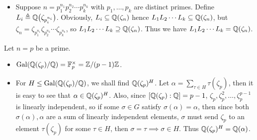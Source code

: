\begin{prop}
\begin{itemize}
      \begin{proof}
        Let $\sigma_k = (\zeta_n \mapsto \zeta_n^k) \in \Gal(\Qb(\zeta_n) / \Qb)$.
        The isomorphism is given by $\sigma_k \mapsto \bar{k}$.
        Clearly, it is a homomorphism since $\sigma_k \sigma_h = (\zeta_n \mapsto \zeta_n^{kh}) = \sigma_{kh}$.
        Also $\sigma_k = 1 \iff \bar{k} = 1$. Finally, $\abs{\Gal(\Qb(\zeta_n) / \Qb)} = \abs{\Fb_n^\times} = \varphi(n)$,
        so the map is onto.
      \end{proof}
    \item Suppose $n = p_1^{n_1} p_2^{n_2} \cdots p_k^{n_k}$ with $p_1, \dots, p_k$ are distinct primes.
      Define $L_i \triangleq \mathbb{Q}\big(\zeta_{p_i^{n_i}}\big)$. Obviously,
      $L_i \subseteq \mathbb{Q}(\zeta_n)$ hence $L_1 L_2 \dotsm L_k \subseteq \mathbb{Q}(\zeta_n)$,
      but $\zeta_n = \zeta_{p_1^{n_1}} \zeta_{p_2^{n_2}} \dotsm \zeta_{p_k^{n_k}}$,
      so $L_1 L_2 \dotsm L_k \supseteq \mathbb{Q}(\zeta_n)$. Thus we have
      $L_1 L_2 \dotsm L_k = \mathbb{Q}(\zeta_n)$.
  \end{itemize}
\end{prop}

\begin{example}
  Let $n = p$ be a prime.
  \begin{itemize}
    \item $\operatorname{Gal}(\mathbb{Q}(\zeta_p) / \mathbb{Q}) = \mathbb{F}_p^\times = \mathbb{Z} / (p-1)\mathbb{Z}$.
    \item For $H \leq \operatorname{Gal}(\mathbb{Q}(\zeta_p) / \mathbb{Q})$, we shall find $\mathbb{Q}(\zeta_p)^H$.
      Let $\alpha = \sum_{\tau \in H} \tau(\zeta_p)$, then it is easy to
      see that $\alpha \in \mathbb{Q}(\zeta_p)^H$. Also, since $[\mathbb{Q}(\zeta_p): \mathbb{Q}] = p-1$,
      $\zeta_p, \zeta_p^2, \dots, \zeta_p^{p-1}$ is linearly independent,
      so if some $\sigma \in G$ satisfy $\sigma(\alpha) = \alpha$, then since
      both $\sigma(\alpha), \alpha$ are a sum of linearly independent elements,
      $\sigma$ must send $\zeta_p$ to an element $\tau(\zeta_p)$ for some $\tau \in H$,
      then $\sigma = \tau \implies \sigma \in H$. Thus $\mathbb{Q}(\zeta_p)^H = \mathbb{Q}(\alpha)$.
  \end{itemize}
\end{example}

